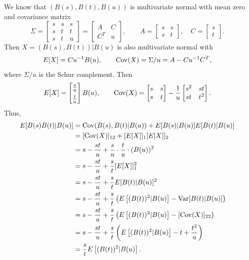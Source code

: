 \documentclass{homework}
\begin{document}
	\question 
	\begin{alphaparts}
		\questionpart We know that $(B(s), B(t), B(u))$ is multivariate normal with mean zero and covariance matrix
		\begin{equation*}
			\Sigma = \left[\begin{matrix}
				s & s & s \\
				s & t & t \\
				s & t & u	
			\end{matrix}\right] = \left[\begin{matrix}
				A & C \\
				C^T & u
			\end{matrix}\right], \qquad A = \left[\begin{matrix}s & s \\ s & t\end{matrix}\right],\quad C = \left[\begin{matrix}s \\ t\end{matrix}\right].
		\end{equation*}
		Then $X = (B(s), B(t))|B(u)$ is also multivariate normal with 
		\begin{equation*}
			E[X] = Cu^{-1}B(u), \qquad \mathrm{Cov}(X) = \Sigma / u = A - Cu^{-1}C^T,
		\end{equation*}
		where $\Sigma / u$ is the Schur complement. Then
		\begin{equation*}
			E[X] = \left[\begin{matrix}
				\frac{s}{u}\\[0.5em] \frac{t}{u}
			\end{matrix}\right]B(u), \qquad 
			\mathrm{Cov}(X) = \left[\begin{matrix}s & s \\ s & t\end{matrix}\right] - \frac{1}{u}\left[\begin{matrix}s^2 & st \\ st & t^2\end{matrix}\right].
		\end{equation*}
		Thus,
		\begin{align*}
			E[B(s)B(t)|B(u)] &= \mathrm{Cov}(B(s), B(t)|B(u)) + E[B(s)|B(u)]E[B(t)|B(u)] \\
			&= [\mathrm{Cov}(X)]_{12} +[E[X]]_1[E[X]]_2 \\
			&= s - \frac{st}{u} + \frac{s}{u}\cdot\frac{t}{u}\cdot(B(u))^2 \\
			&= s- \frac{st}{u} + \frac{s}{t}[E[X]]_1^2 \\
			&= s-\frac{st}{u} + \frac{s}{t}E[B(t)|B(u)]^2 \\
			&= s - \frac{st}{u} + \frac{s}{t}\left(E\left[(B(t))^2|B(u)\right] - \mathrm{Var}[B(t)|B(u)]\right) \\
			&= s-\frac{st}{u} + \frac{s}{t}\left(E\left[(B(t))^2|B(u)\right] - [\mathrm{Cov}(X)]_{22}\right) \\
			&= s-\frac{st}{u} + \frac{s}{t}\left(E\left[(B(t))^2|B(u)\right] - t + \frac{t^2}{u}\right) \\
			&= \frac{s}{t}E\left[(B(t))^2|B(u)\right].
		\end{align*}
		

\end{alphaparts}
\end{document}
